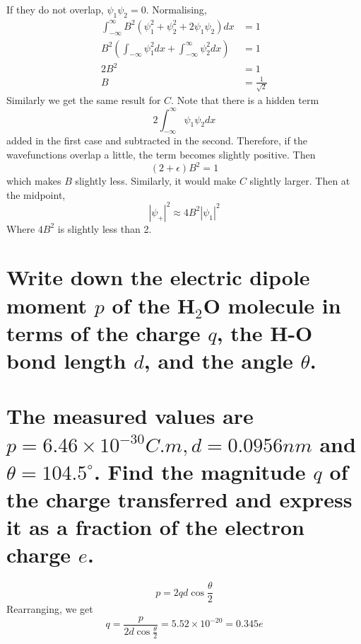 \documentclass[answers]{exam}
\begin{document}
\begin{questions}
\begin{solution}
	If they do not overlap, $\psi_1\psi_2=0$. Normalising,
	\begin{align*}
		\int_{-\infty}^\infty B^2(\psi_1^2 + \psi_2^2 + 2\psi_1\psi_2) dx &= 1 \\
		B^2\left(\int_{-\infty} \psi_1^2 dx + \int_{-\infty}^\infty \psi_2^2 dx\right) &= 1 \\
		2B^2 &= 1 \\
		B &= \frac{1}{\sqrt{2}}
	\end{align*}
	Similarly we get the same result for $C$. Note that there is a hidden term
	$$2\int_{-\infty}^\infty \psi_1\psi_2 dx$$
	added in the first case and subtracted in the second. Therefore, if the wavefunctions overlap a little, the term becomes slightly positive. Then
	$$(2+\epsilon)B^2 = 1$$
	which makes $B$ slightly less. Similarly, it would make $C$ slightly larger. Then at the midpoint,
	$$|\psi_+|^2 \approx 4B^2|\psi_1|^2$$
	Where $4B^2$ is slightly less than 2.
\end{solution}


\begin{parts}
	\part{Write down the electric dipole moment $p$ of the H$_2$O molecule in terms of the charge $q$, the H-O bond length $d$, and the angle $\theta$.}
	\part{The measured values are $p = 6.46 \times 10^{-30} \unit{C.m}, d = 0.0956\unit{nm}$ and $\theta = 104.5^\circ$. Find the magnitude $q$ of the charge transferred and express it as a fraction of the electron charge $e$.}
\end{parts}

\begin{solution}
	$$p = 2qd\cos\frac{\theta}{2}$$
	Rearranging, we get
	$$q = \frac{p}{2d\cos\frac{\theta}{2}} = 5.52 \times 10^{-20} = 0.345e$$
\end{solution}



\end{questions}
\end{document}
